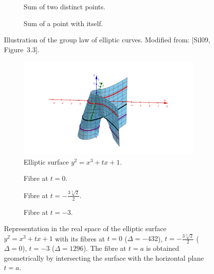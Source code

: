 \documentclass{article}
\begin{document}
\begin{figure}[!ht]
\begin{center}
\begin{subfigure}{0.45\textwidth}
\centering
{}

\caption{Sum of two distinct points.}
\end{subfigure}
\begin{subfigure}{0.45\textwidth}
\centering
{}

\caption{Sum of a point with itself.}
\end{subfigure}
\caption{Illustration of the group law of elliptic curves. Modified from: [Sil09, Figure~3.3].}
\end{center}
\end{figure}

\begin{figure}[!ht]
\begin{center}
\begin{subfigure}{\textwidth}
\centering
\includegraphics[scale=0.5]{elliptic-surface.png}
\caption{Elliptic surface $y^2=x^3+tx+1$.}
\end{subfigure}
\vspace{10mm}

\begin{subfigure}{0.3\textwidth}
\centering
{}

\caption{Fibre at $t=0$.}
\end{subfigure}
\begin{subfigure}{0.3\textwidth}
\centering
{}

\caption{Fibre at $t=-\frac{3\sqrt[3]{2}}{2}$.}
\end{subfigure}
\begin{subfigure}{0.3\textwidth}
\centering
{}

\caption{Fibre at $t=-3$.}
\end{subfigure}
\caption{Representation in the real space of the elliptic surface $y^2=x^3+tx+1$ with its fibres at $t=0$ ($\Delta=-432$), $t=-\frac{3\sqrt[3]{2}}{2}$ ($\Delta=0$), $t=-3$ ($\Delta=1296$). The fibre at $t=a$ is obtained geometrically by intersecting the surface with the horizontal plane $t=a$.}
\end{center}
\end{figure}
\end{document}
